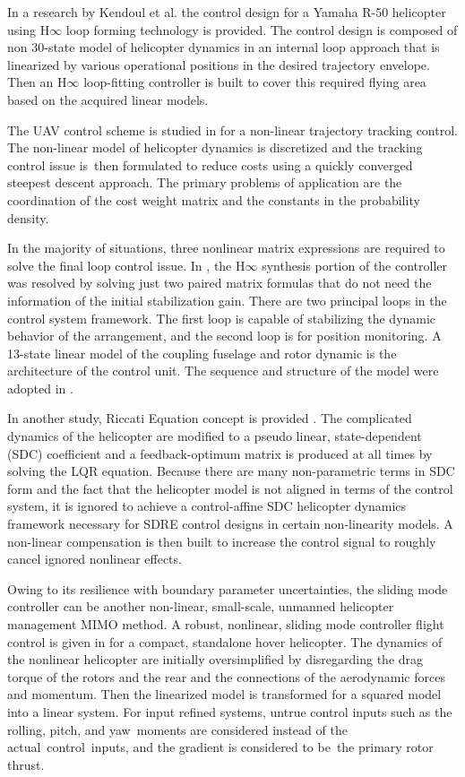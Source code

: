 In a research by Kendoul et al.  \cite{kendoul2007real} the control design for a Yamaha R-50 helicopter using H$\infty$ loop forming technology is provided. The control design is composed of non 30-state model of helicopter dynamics in an internal loop approach that is linearized by various operational positions in the desired trajectory envelope. Then an H$\infty$ loop-fitting controller is built to cover this required flying area based on the acquired linear models.  

The UAV control scheme is studied in \cite{kim2002nonlinear} for a non-linear trajectory tracking control. The non-linear model of helicopter dynamics is discretized and the tracking control issue is then formulated to reduce costs using a quickly converged steepest descent approach. The primary problems of application are the coordination of the cost weight matrix and the constants in the probability density. 

In the majority of situations, three nonlinear matrix expressions are required to solve the final loop control issue. In \cite{gadewadikar2008structured}, the H$\infty$ synthesis portion of the controller was resolved by solving just two paired matrix formulas that do not need the information of the initial stabilization gain. There are two principal loops in the control system framework. The first loop is capable of stabilizing the dynamic behavior of the arrangement, and the second loop is for position monitoring. A 13-state linear model of the coupling fuselage and rotor dynamic is the architecture of the control unit. The sequence and structure of the model were adopted in \cite{mettler2013identification}.

In another study, Riccati Equation concept is provided \cite{bogdanov2007state}. The complicated dynamics of the helicopter are modified to a pseudo linear, state-dependent (SDC) coefficient and a feedback-optimum matrix is produced at all times by solving the LQR equation. Because there are many non-parametric terms in SDC form and the fact that the helicopter model is not aligned in terms of the control system, it is ignored to achieve a control-affine SDC helicopter dynamics framework necessary for SDRE control designs in certain non-linearity models. A non-linear compensation is then built to increase the control signal to roughly cancel ignored nonlinear effects. 

Owing to its resilience with boundary parameter uncertainties, the sliding mode controller can be another non-linear, small-scale, unmanned helicopter management MIMO method. A robust, nonlinear, sliding mode controller flight control is given in \cite{ifassiouen2007robust} for a compact, standalone hover helicopter. The dynamics of the nonlinear helicopter are initially oversimplified by disregarding the drag torque of the rotors and the rear and the connections of the aerodynamic forces and momentum. Then the linearized model is transformed for a squared model into a linear system. For input refined systems, untrue control inputs such as the rolling, pitch, and yaw moments are considered instead of the actual control inputs, and the gradient is considered to be the primary rotor thrust.

